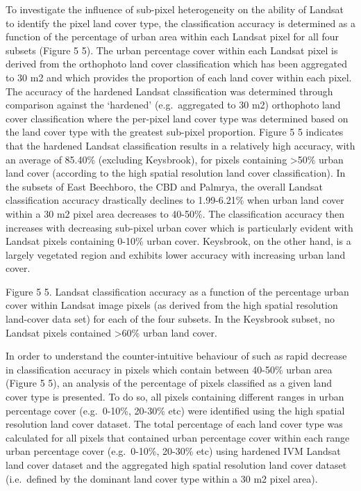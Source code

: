 \documentclass[]{book}
\begin{document}
To investigate the influence of sub-pixel heterogeneity on the ability
of Landsat to identify the pixel land cover type, the classification
accuracy is determined as a function of the percentage of urban area
within each Landsat pixel for all four subsets (Figure 5 5). The urban
percentage cover within each Landsat pixel is derived from the
orthophoto land cover classification which has been aggregated to 30 m2
and which provides the proportion of each land cover within each pixel.
The accuracy of the hardened Landsat classification was determined
through comparison against the `hardened' (e.g.~aggregated to 30 m2)
orthophoto land cover classification where the per-pixel land cover type
was determined based on the land cover type with the greatest sub-pixel
proportion. Figure 5 5 indicates that the hardened Landsat
classification results in a relatively high accuracy, with an average of
85.40\% (excluding Keysbrook), for pixels containing \textgreater{}50\%
urban land cover (according to the high spatial resolution land cover
classification). In the subsets of East Beechboro, the CBD and Palmrya,
the overall Landsat classification accuracy drastically declines to
1.99-6.21\% when urban land cover within a 30 m2 pixel area decreases to
40-50\%. The classification accuracy then increases with decreasing
sub-pixel urban cover which is particularly evident with Landsat pixels
containing 0-10\% urban cover. Keysbrook, on the other hand, is a
largely vegetated region and exhibits lower accuracy with increasing
urban land cover.

Figure 5 5. Landsat classification accuracy as a function of the
percentage urban cover within Landsat image pixels (as derived from the
high spatial resolution land-cover data set) for each of the four
subsets. In the Keysbrook subset, no Landsat pixels contained
\textgreater{}60\% urban land cover.

In order to understand the counter-intuitive behaviour of such as rapid
decrease in classification accuracy in pixels which contain between
40-50\% urban area (Figure 5 5), an analysis of the percentage of pixels
classified as a given land cover type is presented. To do so, all pixels
containing different ranges in urban percentage cover (e.g.~0-10\%,
20-30\% etc) were identified using the high spatial resolution land
cover dataset. The total percentage of each land cover type was
calculated for all pixels that contained urban percentage cover within
each range urban percentage cover (e.g.~0-10\%, 20-30\% etc) using
hardened IVM Landsat land cover dataset and the aggregated high spatial
resolution land cover dataset (i.e.~defined by the dominant land cover
type within a 30 m2 pixel area).
\end{document}
